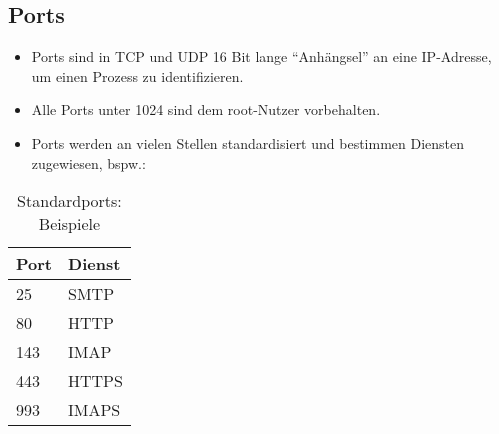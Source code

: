 		\subsection{Ports}
			\begin{itemize}
				\item Ports sind in TCP und UDP 16 Bit lange \enquote{Anhängsel} an eine IP-Adresse, um einen Prozess zu identifizieren.
				\item Alle Ports unter 1024 sind dem root-Nutzer vorbehalten.
				\item Ports werden an vielen Stellen standardisiert und bestimmen Diensten zugewiesen, bspw.:
			\end{itemize}
			\begin{table}[H]
				\centering
				\begin{tabular}{l | l}
					\textbf{Port} & \textbf{Dienst} \\ \hline
					25            & SMTP            \\
					80            & HTTP            \\
					143           & IMAP            \\
					443           & HTTPS           \\
					993           & IMAPS
				\end{tabular}
				\caption{Standardports: Beispiele}
			\end{table}

